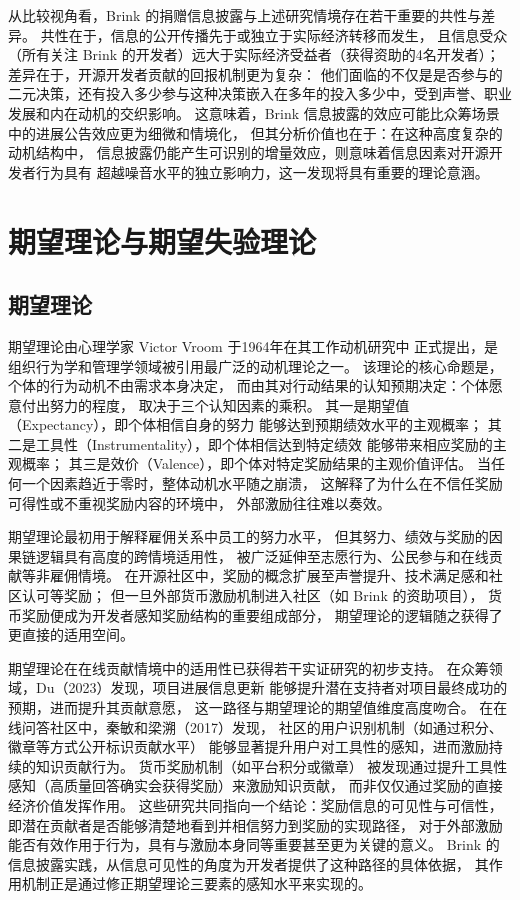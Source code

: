 \documentclass[
    type = master, %
    degree = professional,        %
    decl-page,  %
    twoside,                %
    fontset = fandol %
  ]{njuthesis}
\begin{document}
从比较视角看，Brink 的捐赠信息披露与上述研究情境存在若干重要的共性与差异。
共性在于，信息的公开传播先于或独立于实际经济转移而发生，
且信息受众（所有关注 Brink 的开发者）远大于实际经济受益者（获得资助的4名开发者）；
差异在于，开源开发者贡献的回报机制更为复杂：
他们面临的不仅是是否参与的二元决策，还有投入多少参与这种决策嵌入在多年的投入多少中，受到声誉、职业发展和内在动机的交织影响。
这意味着，Brink 信息披露的效应可能比众筹场景中的进展公告效应更为细微和情境化，
但其分析价值也在于：在这种高度复杂的动机结构中，
信息披露仍能产生可识别的增量效应，则意味着信息因素对开源开发者行为具有
超越噪音水平的独立影响力，这一发现将具有重要的理论意涵。

\section{期望理论与期望失验理论}

\subsection{期望理论}

期望理论由心理学家 Victor Vroom 于1964年在其工作动机研究中
正式提出\cite{vroom1964work}，是组织行为学和管理学领域被引用最广泛的动机理论之一。
该理论的核心命题是，个体的行为动机不由需求本身决定，
而由其对行动结果的认知预期决定：个体愿意付出努力的程度，
取决于三个认知因素的乘积。
其一是期望值（Expectancy），即个体相信自身的努力
能够达到预期绩效水平的主观概率；
其二是工具性（Instrumentality），即个体相信达到特定绩效
能够带来相应奖励的主观概率；
其三是效价（Valence），即个体对特定奖励结果的主观价值评估。
当任何一个因素趋近于零时，整体动机水平随之崩溃，
这解释了为什么在不信任奖励可得性或不重视奖励内容的环境中，
外部激励往往难以奏效。

期望理论最初用于解释雇佣关系中员工的努力水平，
但其努力、绩效与奖励的因果链逻辑具有高度的跨情境适用性，
被广泛延伸至志愿行为、公民参与和在线贡献等非雇佣情境。
在开源社区中，奖励的概念扩展至声誉提升、技术满足感和社区认可等奖励；
但一旦外部货币激励机制进入社区（如 Brink 的资助项目），
货币奖励便成为开发者感知奖励结构的重要组成部分，
期望理论的逻辑随之获得了更直接的适用空间。

期望理论在在线贡献情境中的适用性已获得若干实证研究的初步支持。
在众筹领域，Du（2023）发现，项目进展信息更新
能够提升潜在支持者对项目最终成功的预期，进而提升其贡献意愿，
这一路径与期望理论的期望值维度高度吻合\cite{du2023impact}。
在在线问答社区中，秦敏和梁溯（2017）发现，
社区的用户识别机制（如通过积分、徽章等方式公开标识贡献水平）
能够显著提升用户对工具性的感知，进而激励持续的知识贡献行为\cite{qin2017user}。
货币奖励机制（如平台积分或徽章）
被发现通过提升工具性感知（高质量回答确实会获得奖励）来激励知识贡献，
而非仅仅通过奖励的直接经济价值发挥作用。
这些研究共同指向一个结论：奖励信息的可见性与可信性，
即潜在贡献者是否能够清楚地看到并相信努力到奖励的实现路径，
对于外部激励能否有效作用于行为，具有与激励本身同等重要甚至更为关键的意义。
Brink 的信息披露实践，从信息可见性的角度为开发者提供了这种路径的具体依据，
其作用机制正是通过修正期望理论三要素的感知水平来实现的。
\end{document}
